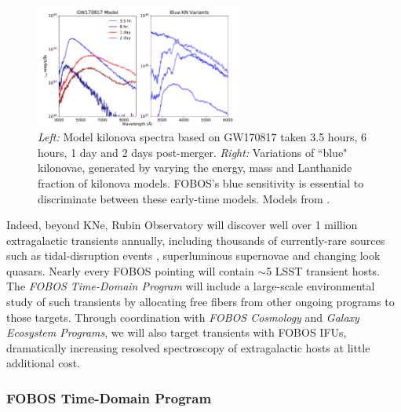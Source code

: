 \documentclass[11pt,a4paper,twoside,onecolumn,openany,final,oldfontcommands]{memoir}
\begin{document}
\begin{figure}
\includegraphics[width=0.6\textwidth]{figs/kn_fobos.pdf}
\caption{\textit{Left:} Model kilonova spectra based on GW170817 taken 3.5 hours, 6 hours, 1 day and 2 days post-merger. \textit{Right:} Variations of ``blue" kilonovae, generated by varying the energy, mass and Lanthanide fraction of kilonova models. FOBOS's blue sensitivity is essential to discriminate between these early-time models. Models from \citet{kasen2017}.}
\label{fig:kilonova}    
\end{figure}

Indeed, beyond KNe, Rubin Observatory will discover well over 1 million extragalactic transients annually, including thousands of currently-rare sources such as tidal-disruption events \citep{bricman2020}, superluminous supernovae \citep{villar2018} and changing look quasars. Nearly every FOBOS pointing will contain $\sim$5 LSST transient hosts.  The \textit{FOBOS Time-Domain Program} will include a large-scale environmental study of such transients by allocating free fibers from other ongoing programs to those targets.  Through coordination with \textit{FOBOS Cosmology} and \textit{Galaxy Ecosystem Programs}, we will also target transients with FOBOS IFUs, dramatically increasing resolved spectroscopy of extragalactic hosts \citep[see a recent review by][]{anderson2015} at little additional cost. 



\subsubsection{FOBOS Time-Domain Program}
\end{document}
